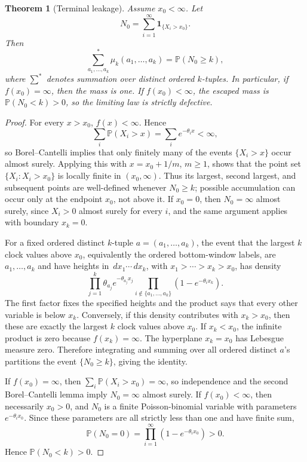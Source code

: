 \documentclass[11pt]{article}
\newtheorem{theorem}{Theorem}[section]
\theoremstyle{remark}
\newcommand{\Pp}{\mathbb P}
\newcommand{\one}{\mathbf 1}
\newcommand{\dd}{\,d}
\begin{document}
\begin{theorem}[Terminal leakage]\label{thm:leakage}
Assume \(x_0<\infty\).  Let
\[
        N_0=\sum_{i=1}^{\infty}\one_{\{X_i>x_0\}}.
\]
Then
\[
        \sum_{a_1,\ldots,a_k}^{*}\mu_k(a_1,\ldots,a_k)
        =\Pp(N_0\ge k),
\]
where \(\sum^*\) denotes summation over distinct ordered \(k\)-tuples.  In
particular, if \(f(x_0)=\infty\), then the mass is one.  If
\(f(x_0)<\infty\), the escaped mass is \(\Pp(N_0<k)>0\), so the limiting law
is strictly defective.
\end{theorem}

\begin{proof}
For every \(x>x_0\), \(f(x)<\infty\).  Hence
\[
        \sum_i \Pp(X_i>x)=\sum_i e^{-\theta_i x}<\infty,
\]
so Borel--Cantelli implies that only finitely many of the events
\(\{X_i>x\}\) occur almost surely.  Applying this with
\(x=x_0+1/m\), \(m\ge1\), shows that the point set
\(\{X_i:X_i>x_0\}\) is locally finite in \((x_0,\infty)\).  Thus its
largest, second largest, and subsequent points are well-defined whenever
\(N_0\ge k\); possible accumulation can occur only at the endpoint \(x_0\),
not above it.  If \(x_0=0\), then \(N_0=\infty\) almost surely, since
\(X_i>0\) almost surely for every \(i\), and the same argument applies with
boundary \(x_k=0\).

For a fixed ordered distinct \(k\)-tuple \(a=(a_1,\ldots,a_k)\), the event that
the largest \(k\) clock values above \(x_0\), equivalently the ordered
bottom-window labels, are \(a_1,\ldots,a_k\) and have heights in
\(\dd x_1\cdots\dd x_k\), with \(x_1>\cdots>x_k>x_0\), has density
\[
     \prod_{j=1}^k \theta_{a_j}e^{-\theta_{a_j}x_j}
     \prod_{i\notin\{a_1,\ldots,a_k\}}(1-e^{-\theta_i x_k}).
\]
The first factor fixes the specified heights and the product says that every other variable is below \(x_k\).  Conversely, if this density contributes with \(x_k>x_0\), then these are exactly the largest \(k\) clock values above \(x_0\).  If \(x_k<x_0\), the infinite product is zero because \(f(x_k)=\infty\).  The hyperplane \(x_k=x_0\) has Lebesgue measure zero.  Therefore integrating and summing over all ordered distinct \(a\)'s partitions the event \(\{N_0\ge k\}\), giving the identity.

If \(f(x_0)=\infty\), then \(\sum_i\Pp(X_i>x_0)=\infty\), so
independence and the second Borel--Cantelli lemma imply \(N_0=\infty\) almost
surely.  If \(f(x_0)<\infty\), then necessarily $x_0>0$, and $N_0$ is a
finite Poisson-binomial variable with parameters $e^{-\theta_i x_0}$.  Since
these parameters are all strictly less than one and have finite sum,
\[
        \Pp(N_0=0)=\prod_{i=1}^\infty
        (1-e^{-\theta_i x_0})>0.
\]
Hence $\Pp(N_0<k)>0$.
\end{proof}
\end{document}
